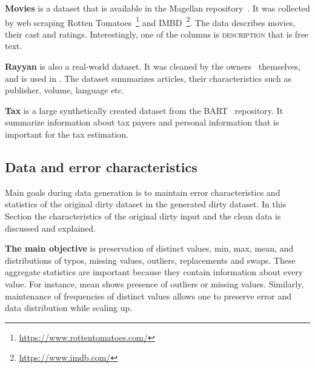 \textbf{Movies} is a dataset that is available in the Magellan repository~\cite{DasDGGKGP2016, KondaDSDABLPZNPKDR2016}.
It was collected by web scraping Rotten Tomatoes~\footnote{\url{https://www.rottentomatoes.com/}} and IMBD~\footnote{\url{https://www.imdb.com/}}.
The data describes movies, their cast and ratings. 
Interestingly, one of the columns is \textsc{description} that is free text.

\textbf{Rayyan} is also a real-world dataset. 
It was cleaned by the owners~\cite{QuzzaniHFE2016} themselves, and is used in \textcite{MahdaviAFMQST2019, MahdaviA2020}.
The dataset summarizes articles, their characteristics such as publisher, volume, language etc.

\textbf{Tax} is a large synthetically created dataset from the BART~\cite{bart} repository.
It summarize information about tax payers and personal information that is important for the tax estimation.

\subsection{Data and error characteristics}
\label{sec:data_characteristics}
Main goals during data generation is to maintain error characteristics and  statistics of the original dirty dataset in the generated dirty dataset.
In this Section the characteristics of the original dirty input and the clean data is discussed and explained. 

\textbf{The main objective} is preservation of distinct values, min, max, mean, and distributions of typos, missing values, outliers, replacements and swaps.
These aggregate statistics are important because they contain information about every value.
For instance, mean shows presence of outliers or missing values.
Similarly, maintenance of frequencies of distinct values allows one to preserve error and data distribution while scaling up.

